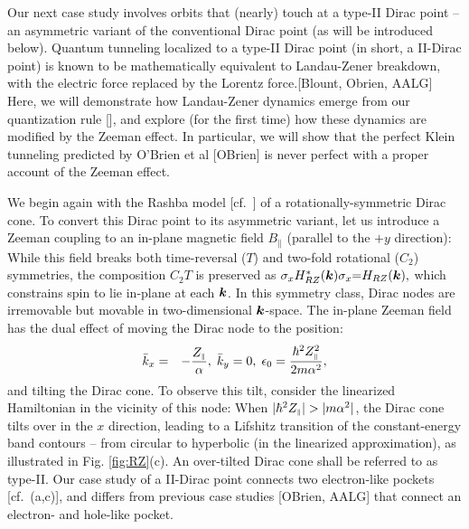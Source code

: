 \documentclass[aps, prb, showpacs, twocolumn, notitlepage, superscriptaddress]{revtex4-1}
\begin{document}
Our next case study involves orbits that (nearly) touch at a type-II Dirac point -- an asymmetric variant of the conventional Dirac point (as will be introduced below). Quantum tunneling localized to a type-II Dirac point  (in short, a II-Dirac point) is known to be mathematically equivalent to  Landau-Zener breakdown, with the electric force replaced by the Lorentz force.[Blount, Obrien, AALG] Here, we will demonstrate how  Landau-Zener dynamics emerge from our quantization rule [], and explore (for the first time) how these dynamics are modified by the Zeeman effect. In particular, we will show that the perfect Klein tunneling predicted by O'Brien et al [OBrien] is never perfect with a proper account of the Zeeman effect. 


We begin again with the Rashba model [cf.\ ] of a rotationally-symmetric Dirac cone. To convert this Dirac point to its asymmetric variant, 
let us introduce a Zeeman coupling to an in-plane magnetic field $B_\parallel$ (parallel to the $+y$ direction):
While this field breaks both time-reversal ($T$) and two-fold rotational ($C_2$) symmetries, the composition $C_2T$ is preserved as $\sigma_x H^*_{RZ}(\boldsymbol{k})\sigma_x{=}H_{RZ}(\boldsymbol{k}),$ which constrains spin to lie in-plane at each $\boldsymbol{k}$. In this symmetry class, Dirac nodes are irremovable but movable   in two-dimensional $\boldsymbol{k}$-space. The in-plane Zeeman field has the dual effect of  moving the Dirac node  to the position:
\begin{eqnarray}
\bar{k}_x & = & -\frac{Z_{\scriptscriptstyle{\parallel}}}{\alpha},\;\bar{k}_y=0,\;\epsilon_{0}=\frac{{\hbar^2}Z_{\scriptscriptstyle{\parallel}}^{2}}{2m\alpha^2},\label{whereisdiracpoint}
\end{eqnarray}
and tilting the Dirac cone. To observe this tilt, consider the linearized Hamiltonian in the vicinity of this node: 
When $|\hbar^2\zpar|>|m\alpha^2|$, the Dirac cone tilts over in the $x$ direction, leading to a Lifshitz transition  of the constant-energy band contours -- from circular to hyperbolic (in the linearized approximation), as illustrated in Fig. \ref{fig:RZ}(c). An over-tilted Dirac cone shall be referred to as type-II. Our case study of a II-Dirac point  connects  two electron-like  pockets [cf.\ (a,c)], and  differs from previous case studies [OBrien, AALG] that connect an electron- and hole-like pocket.
\end{document}
